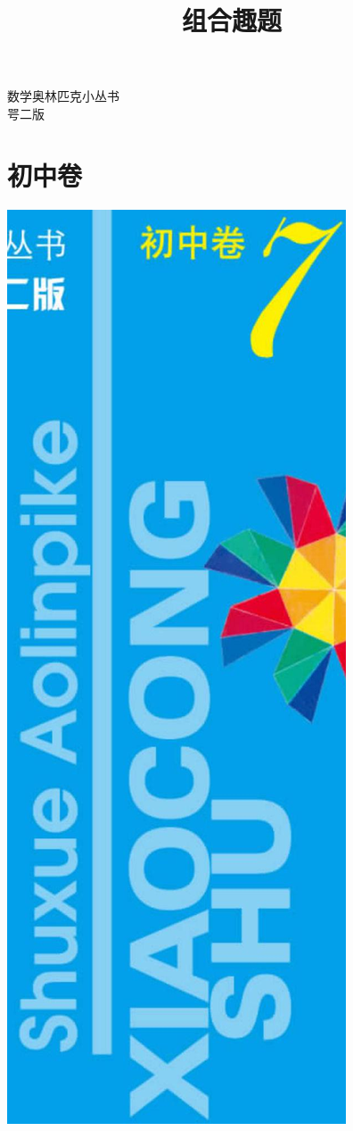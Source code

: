 \documentclass[10pt]{article}
\title{组合趣题 }
\author{}
\date{}
\begin{document}
\maketitle
数学奥林匹克小丛书\\
咢二版

\section{初中卷}
\begin{center}
\includegraphics[max width=\textwidth]{2024_10_09_bce9f07034ef55fc9c97g-01}
\end{center}
\end{document}
